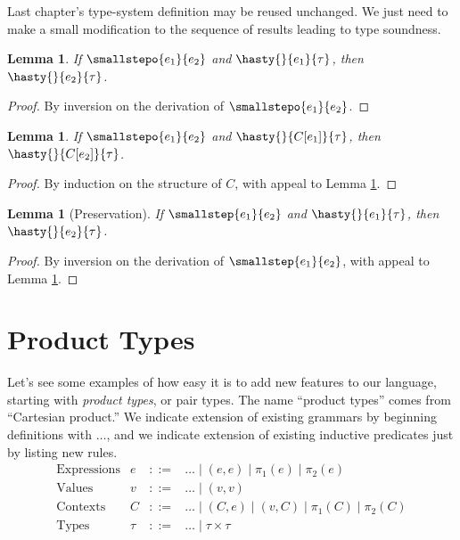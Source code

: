 \documentclass{amsbook}
\newtheorem{lemma}[theorem]{Lemma}
\theoremstyle{definition}
\theoremstyle{remark}
\numberwithin{section}{chapter}
\numberwithin{equation}{chapter}
\begin{document}
Last chapter's type-system definition may be reused unchanged.
We just need to make a small modification to the sequence of results leading to type soundness.

\begin{lemma}\label{preservation0}
  If $\smallstepo{e_1}{e_2}$ and $\hasty{}{e_1}{\tau}$, then $\hasty{}{e_2}{\tau}$.
\end{lemma}
\begin{proof}
  By inversion on the derivation of $\smallstepo{e_1}{e_2}$.
\end{proof}

\begin{lemma}\label{preservation_prime}
  If $\smallstepo{e_1}{e_2}$ and $\hasty{}{C[e_1]}{\tau}$, then $\hasty{}{C[e_2]}{\tau}$.
\end{lemma}
\begin{proof}
  By induction on the structure of $C$, with appeal to Lemma \ref{preservation0}.
\end{proof}

\begin{lemma}[Preservation]\label{preservation}
  If $\smallstep{e_1}{e_2}$ and $\hasty{}{e_1}{\tau}$, then $\hasty{}{e_2}{\tau}$.
\end{lemma}
\begin{proof}
  By inversion on the derivation of $\smallstep{e_1}{e_2}$, with appeal to Lemma \ref{preservation_prime}.
\end{proof}

\section{Product Types}

Let's see some examples of how easy it is to add new features to our language, starting with \emph{product types}, or pair types.
The name ``product types'' comes from ``Cartesian product.''
We indicate extension of existing grammars by beginning definitions with $\ldots$, and we indicate extension of existing inductive predicates just by listing new rules.
$$\begin{array}{rrcl}
  \textrm{Expressions} & e &::=& \ldots \mid (e, e) \mid \pi_1(e) \mid \pi_2(e) \\
  \textrm{Values} & v &::=& \ldots \mid (v, v) \\
  \textrm{Contexts} & C &::=& \ldots \mid (C, e) \mid (v, C) \mid \pi_1(C) \mid \pi_2(C) \\
  \textrm{Types} & \tau &::=& \ldots \mid \tau \times \tau
\end{array}$$
\end{document}
